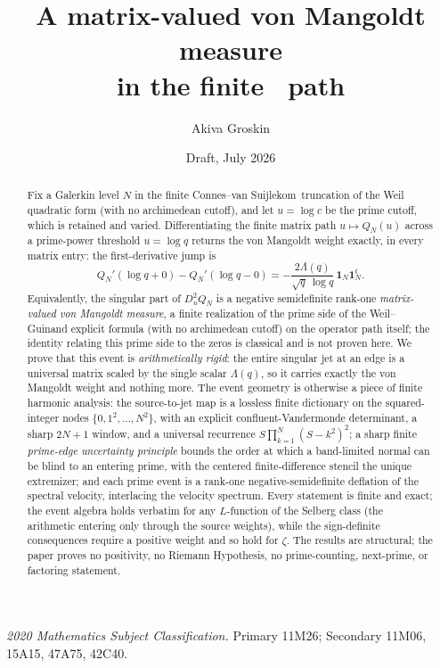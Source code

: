 \documentclass[11pt]{article}
\title{A matrix-valued von Mangoldt measure\\
in the finite \cvs\ path}
\author{Akiva Groskin}
\date{Draft, July 2026}
\theoremstyle{plain}
\theoremstyle{definition}
\theoremstyle{remark}
\newcommand{\cvs}{Connes--van Suijlekom}
\newcommand{\one}{\mathbf 1}
\newcommand{\Lam}{\Lambda}
\begin{document}
\maketitle

\begin{abstract}
Fix a Galerkin level $N$ in the finite \cvs\ truncation of the Weil
quadratic form (with no archimedean cutoff), and let $u=\log c$ be the prime
cutoff, which is retained and varied. Differentiating the
finite matrix path $u\mapsto Q_N(u)$ across a prime-power threshold $u=\log q$
returns the von Mangoldt weight exactly, in every matrix entry: the
first-derivative jump is
\[
        Q_N'(\log q+0)-Q_N'(\log q-0)
        =-\frac{2\Lam(q)}{\sqrt q\,\log q}\,\one_N\one_N^t .
\]
Equivalently, the singular part of $D_u^2Q_N$ is a negative semidefinite
rank-one \emph{matrix-valued von Mangoldt measure}, a finite realization of the
prime side of the Weil--Guinand explicit formula (with no archimedean cutoff) on
the operator path itself; the identity relating this prime side to the zeros is
classical and is not proven here. We prove that this event is
\emph{arithmetically rigid}:
the entire singular jet at an edge is a universal matrix scaled by the single
scalar $\Lam(q)$, so it carries exactly the von Mangoldt weight and nothing
more. The event geometry is otherwise a piece of finite harmonic analysis: the
source-to-jet map is a lossless finite dictionary on the squared-integer nodes
$\{0,1^2,\dots,N^2\}$, with an explicit confluent-Vandermonde determinant, a
sharp $2N{+}1$ window, and a universal recurrence $S\prod_{k=1}^N(S-k^2)^2$; a
sharp finite \emph{prime-edge uncertainty principle} bounds the order at which a
band-limited normal can be blind to an entering prime, with the centered
finite-difference stencil the unique extremizer; and each prime event is a
rank-one negative-semidefinite deflation of the spectral velocity, interlacing
the velocity spectrum. Every statement is finite and exact; the event algebra
holds verbatim for any $L$-function of the Selberg class (the arithmetic entering
only through the source weights), while the sign-definite consequences require a
positive weight and so hold for $\zeta$. The results are structural; the paper
proves no positivity, no Riemann Hypothesis, no prime-counting, next-prime, or
factoring statement.
\end{abstract}

\medskip
\noindent\textit{2020 Mathematics Subject Classification.} Primary 11M26;
Secondary 11M06, 15A15, 47A75, 42C40.
\end{document}
